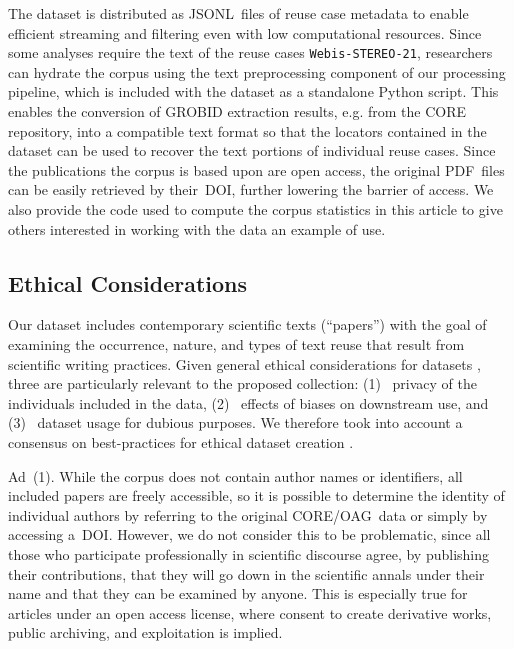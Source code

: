 \documentclass[fleqn,10pt]{wlscirep}
\newcommand{\Ni}{(1)~}
\newcommand{\Nii}{(2)~}
\newcommand{\Niii}{(3)~}
\newcommand{\webisReuseCorpus}{\texttt{Webis-STEREO-21}\xspace}
\begin{document}
The dataset is distributed as JSONL~files of reuse case metadata to enable efficient streaming and filtering even with low computational resources. Since some analyses require the text of the reuse cases \webisReuseCorpus, researchers can hydrate the corpus using the text preprocessing component of our processing pipeline, which is included with the dataset as a standalone Python script. This enables the conversion of GROBID extraction results, e.g. from the CORE repository, into a compatible text format so that the locators contained in the dataset can be used to recover the text portions of individual reuse cases. Since the publications the corpus is based upon are open access, the original PDF~files can be easily retrieved by their~DOI, further lowering the barrier of access. We also provide the code used to compute the corpus statistics in this article to give others interested in working with the data an example of use.


\subsection*{Ethical Considerations}

Our dataset includes contemporary scientific texts (``papers'') with the goal of examining the occurrence, nature, and types of text reuse that result from scientific writing practices. Given general ethical considerations for datasets \cite{peng:2021}, three are particularly relevant to the proposed collection:
\Ni
privacy of the individuals included in the data, 
\Nii
effects of biases on downstream use, and
\Niii
dataset usage for dubious purposes.
We therefore took into account a consensus on best-practices for ethical dataset creation \cite{mieskes:2017,leidner:2017,gebru:2021}.

Ad~(1).
While the corpus does not contain author names or identifiers, all included papers are freely accessible, so it is possible to determine the identity of individual authors by referring to the original CORE/OAG~data or simply by accessing a~DOI. However, we do not consider this to be problematic, since all those who participate professionally in scientific discourse agree, by publishing their contributions, that they will go down in the scientific annals under their name and that they can be examined by anyone. This is especially true for articles under an open access license, where consent to create derivative works, public archiving, and exploitation is implied.
\end{document}
